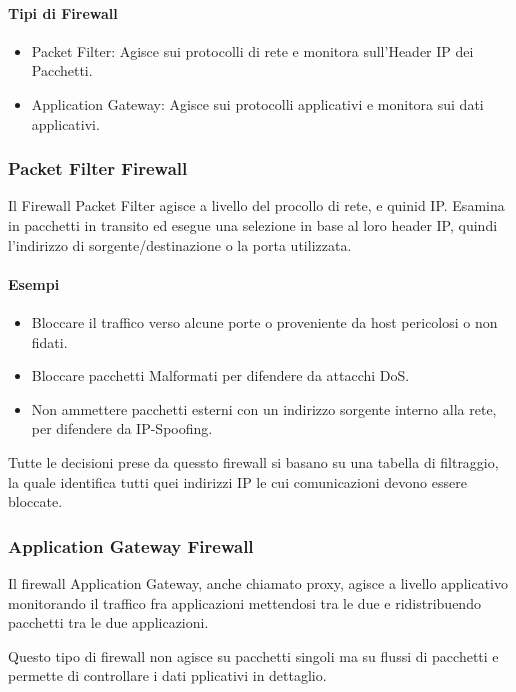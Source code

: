 \documentclass[12pt, a4paper, openany]{book}
\begin{document}
\paragraph*{Tipi di Firewall}
\begin{itemize}
    \item Packet Filter: Agisce sui protocolli di rete e monitora sull'Header IP dei Pacchetti.
    \item Application Gateway: Agisce sui protocolli applicativi e monitora sui dati applicativi.
\end{itemize}

\subsubsection*{Packet Filter Firewall}
Il Firewall Packet Filter agisce a livello del procollo di rete, e quinid IP.
Esamina in pacchetti in transito ed esegue una selezione in base al loro header IP, quindi l'indirizzo di sorgente/destinazione o la porta utilizzata.

\paragraph*{Esempi}
\begin{itemize}
    \item Bloccare il traffico verso alcune porte o proveniente da host pericolosi o non fidati.
    \item Bloccare pacchetti Malformati per difendere da attacchi DoS.
    \item Non ammettere pacchetti esterni con un indirizzo sorgente interno alla rete, per difendere da IP-Spoofing. 
\end{itemize}

Tutte le decisioni prese da quessto firewall si basano su una tabella di filtraggio, la quale identifica tutti quei indirizzi IP le cui comunicazioni devono essere bloccate.

\subsubsection{Application Gateway Firewall}
Il firewall Application Gateway, anche chiamato proxy, agisce a livello applicativo
monitorando il traffico fra applicazioni mettendosi tra le due e ridistribuendo pacchetti tra le due applicazioni.

Questo tipo di firewall non agisce su pacchetti singoli ma su flussi di pacchetti e permette di controllare i dati pplicativi in dettaglio.
\end{document}
